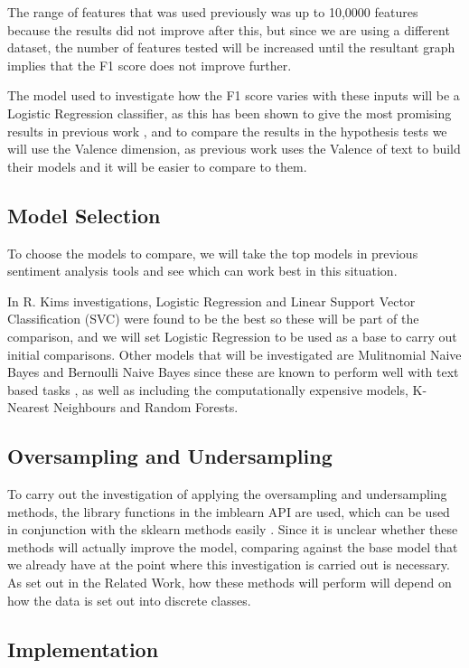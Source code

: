 The range of features that was used previously was up to 10,0000 features because the results did not improve after this, but since we are using a different dataset, the number of features tested will be increased until the resultant graph implies that the F1 score does not improve further.

The model used to investigate how the F1 score varies with these inputs will be a Logistic Regression classifier, as this has been shown to give the most promising results in previous work \cite{towardsDS}, and to compare the results in the hypothesis tests we will use the Valence dimension, as previous work uses the Valence of text to build their models and it will be easier to compare to them.

\subsection{Model Selection}

To choose the models to compare, we will take the top models in previous sentiment analysis tools and see which can work best in this situation. 

In R. Kims investigations, Logistic Regression and Linear Support Vector Classification (SVC) were found to be the best so these will be part of the comparison, and we will set Logistic Regression to be used as a base to carry out initial comparisons. 
Other models that will be investigated are Mulitnomial Naive Bayes and Bernoulli Naive Bayes since these are known to perform well with text based tasks \cite{socher2013recursive}, as well as including the computationally expensive models, K-Nearest Neighbours and Random Forests. 

\subsection{Oversampling and Undersampling}

To carry out the investigation of applying the oversampling and undersampling methods, the library functions in the imblearn API are used, which can be used in conjunction with the sklearn methods easily \cite{sklearn}.
Since it is unclear whether these methods will actually improve the model, comparing against the base model that we already have at the point where this investigation is carried out is necessary. As set out in the Related Work, how these methods will perform will depend on how the data is set out into discrete classes.

\subsection{Implementation}

